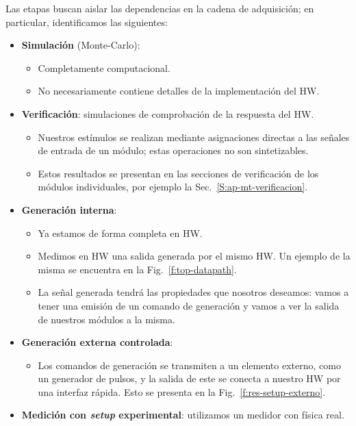 Las etapas buscan aislar las dependencias en la cadena de adquisición; en particular, identificamos las siguientes:
\begin{itemize}
  \item \textbf{Simulación} (Monte-Carlo):
  \begin{itemize}
    \item Completamente computacional.
    \item No necesariamente contiene detalles de la implementación del HW.
  \end{itemize}
  \item \textbf{Verificación}: simulaciones de comprobación de la respuesta del
    HW.
  \begin{itemize}
    \item Nuestros estímulos se realizan mediante asignaciones directas a las
      señales de entrada de un módulo; estas operaciones no son sintetizables.
    \item Estos resultados se presentan en las secciones de verificación de los
      módulos individuales, por ejemplo la Sec.~\ref{S:ap-mt-verificacion}.
  \end{itemize}
  \item \textbf{Generación interna}:
  \begin{itemize}
    \item Ya estamos de forma completa en HW.
    \item Medimos en HW una salida generada por el mismo HW. Un ejemplo de la
      misma se encuentra en la
      Fig.~\ref{f:top-datapath}.
    \item La señal generada tendrá las propiedades que nosotros deseamos: vamos
      a tener una emisión de un comando de generación y vamos a ver la salida de
      nuestros módulos a la misma.
  \end{itemize}
  \item \textbf{Generación externa controlada}:
  \begin{itemize}
    \item Los comandos de generación se transmiten a un elemento externo, como
      un generador de pulsos, y la salida de este se conecta a nuestro HW por
      una interfaz rápida. Esto se presenta en la
      Fig.~\ref{f:res-setup-externo}.
  \end{itemize}
  \item \textbf{Medición con \emph{setup} experimental}: utilizamos un medidor con
    física real.
\end{itemize}

